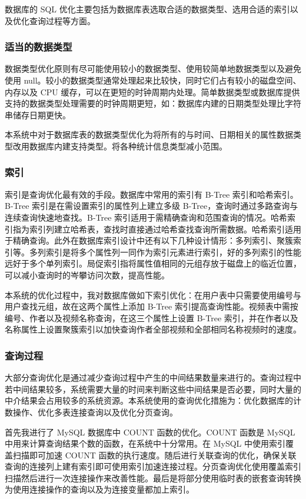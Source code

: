 数据库的 SQL 优化主要包括为数据库表选取合适的数据类型、选用合适的索引以及优化查询过程等方面。

\subsubsection{适当的数据类型}

数据类型优化原则有尽可能使用较小的数据类型、使用较简单地数据类型以及避免使用 null。较小的数据类型通常处理起来比较快，同时它们占有较小的磁盘空间、内存以及 CPU 缓存，可以在更短的时钟周期内处理。简单数据类型或数据库提供支持的数据类型处理需要的时钟周期更短，如：数据库内建的日期类型处理比字符串储存日期更快。

本系统中对于数据库表的数据类型优化为将所有的与时间、日期相关的属性数据类型改用数据库内建支持类型。将各种统计信息类型减小范围。

\subsubsection{索引}

索引是查询优化最有效的手段。数据库中常用的索引有 B-Tree\cite{严蔚敏2002数据结构} 索引和哈希索引。B-Tree 索引是在需设置索引的属性列上建立多级 B-Tree，查询时通过多路查询与连续查询快速地查找。B-Tree 索引适用于需精确查询和范围查询的情况。哈希索引指为索引列建立哈希表，查找时直接通过哈希查找查询所需数据。哈希索引适用于精确查询。此外在数据库索引设计中还有以下几种设计情形：多列索引、聚簇索引等。多列索引是将多个属性列一同作为索引元素进行索引，好的多列索引的性能远好于多个单列索引。局促索引指将属性值相同的元组存放于磁盘上的临近位置，可以减小查询时的岑攀访问次数，提高性能。

本系统的优化过程中，我对数据库做如下索引优化：在用户表中只需要使用编号与用户查找元组，故在这两个属性上添加 B-Tree 索引提高查询性能。视频表中需按编号、作者以及视频名称查询，在这三个属性上设置 B-Tree 索引，并在作者以及名称属性上设置聚簇索引以加快查询作者全部视频和全部相同名称视频时的速度。 

\subsubsection{查询过程}

大部分查询优化是通过减少查询过程中产生的中间结果数量来进行的。查询过程中若中间结果较多，系统需要大量的时间来判断这些中间结果是否必要，同时大量的中介结果会占用较多的系统资源。本系统使用的查询优化措施为：优化数据库的计数操作、优化多表连接查询以及优化分页查询。

首先我进行了 MySQL 数据库中 COUNT 函数的优化。COUNT 函数是 MySQL 中用来计算查询结果个数的函数，在系统中十分常用。在 MySQL 中使用索引覆盖扫描即可加速 COUNT 函数的执行速度。随后进行关联查询的优化，确保关联查询的连接列上建有索引即可使用索引加速连接过程。分页查询优化使用覆盖索引扫描然后进行一次连接操作来改善性能。最后是将部分使用临时表的嵌套查询转换为使用连接操作的查询以及为连接变量都加上索引。

